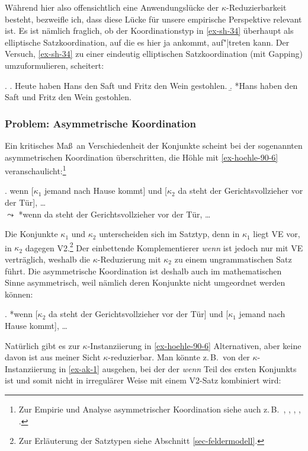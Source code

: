 Während hier also offensichtlich eine Anwendungslücke der $\kappa$-Reduzierbarkeit besteht, bezweifle ich, dass diese Lücke für unsere empirische Perspektive relevant ist. Es ist nämlich fraglich, ob der Koordinationstyp in \ref{ex-sh-34} überhaupt als elliptische Satzkoordination, auf die es hier ja ankommt, auf"|treten kann. Der Versuch, \ref{ex-sh-34} zu einer eindeutig elliptischen Satzkoordination (mit Gapping) umzuformulieren, scheitert:

\ex. 
\a. Heute haben Hans den Saft und Fritz den Wein gestohlen.
\b. *Hans haben den Saft und Fritz den Wein gestohlen. 



\subsubsection*{Problem: Asymmetrische Koordination} \label{sec:asymmetrische:koordination}
 
Ein kritisches Ma\ss\ an Verschiedenheit der Konjunkte scheint bei der sogenannten asymmetrischen Koordination \citep{Hoehle:90} überschritten, die Höhle mit \ref{ex-hoehle-90-6} veranschaulicht:\footnote{Zur Empirie und Analyse asymmetrischer Koordination siehe auch z.\,B.\  \cite{Wunderlich:88}, \cite{Buering:Hartmann:98}, \cite{Kathol:99}, \citet[596ff]{Sternefeld:06}, \cite{Reich:09}.} 

\ex. \label{ex-hoehle-90-6} wenn [$\kappa_1$ jemand nach Hause kommt] und [$\kappa_2$ da steht der Gerichtsvollzieher vor der Tür], \ldots \\
$\leadsto$ *wenn da steht der Gerichtsvollzieher vor der Tür, \ldots \\
\citep[(6)]{Hoehle:90}

Die Konjunkte $\kappa_1$ und $\kappa_2$ unterscheiden sich im Satztyp, denn in $\kappa_1$ liegt VE vor, in $\kappa_2$ dagegen V2.\footnote{Zur Erläuterung der Satztypen siehe Abschnitt \ref{sec-feldermodell}.} Der einbettende Komplementierer {\it wenn} ist jedoch nur mit VE verträglich, weshalb die $\kappa$-Reduzierung mit $\kappa_2$ zu einem ungrammatischen Satz führt. Die asymmetrische Koordination ist deshalb auch im mathematischen Sinne asymmetrisch, weil nämlich deren Konjunkte nicht umgeordnet werden können:

\ex. *wenn [$\kappa_2$ da steht der Gerichtsvollzieher vor der Tür] und [$\kappa_1$ jemand nach Hause kommt], \ldots

Natürlich gibt es zur $\kappa$-Instanziierung in \ref{ex-hoehle-90-6} Alternativen, aber keine davon ist aus meiner Sicht $\kappa$-reduzierbar. Man könnte z.\,B.\  von der $\kappa$-Instanziierung in \ref{ex-ak-1} ausgehen, bei der der  {\it wenn} Teil des ersten Konjunkts ist und somit nicht in irregulärer Weise mit einem V2-Satz kombiniert wird:

